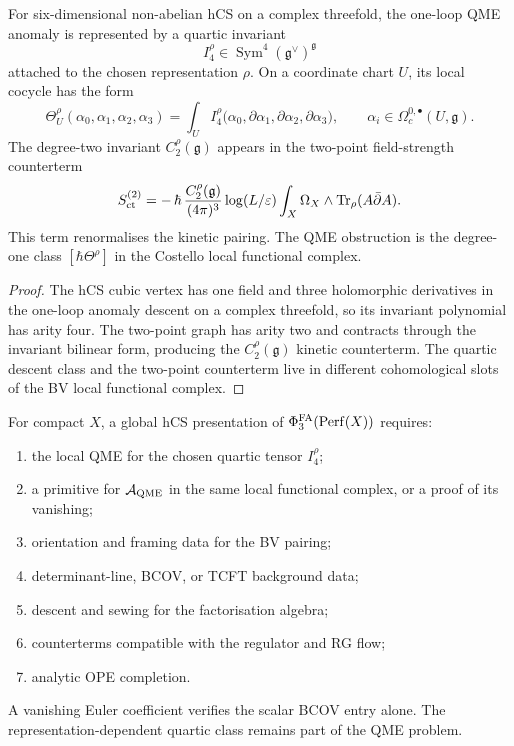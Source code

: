 \begin{proposition}
\label{prop:quartic-qme-quadratic-counterterm}
For six-dimensional non-abelian hCS on a complex threefold, the
one-loop QME anomaly is represented by a quartic invariant
\[
  I_4^\rho\in\operatorname{Sym}^4(\mathfrak g^\vee)^{\mathfrak g}
\]
attached to the chosen representation $\rho$. On a coordinate chart
$U$, its local cocycle has the form
\[
  \Theta^\rho_U(\alpha_0,\alpha_1,\alpha_2,\alpha_3)
  =
  \int_U
  I_4^\rho
  \bigl(\alpha_0,\partial\alpha_1,
  \partial\alpha_2,\partial\alpha_3\bigr),
  \qquad
  \alpha_i\in\Omega^{0,\bullet}_c(U,\mathfrak g).
\]
The degree-two invariant $C_2^\rho(\mathfrak g)$ appears in the
two-point field-strength counterterm
\[
  S_{\mathrm{ct}}^{(2)}
  =
  -\,\hbar\,\frac{C_2^\rho(\mathfrak g)}{(4\pi)^3}
  \log(L/\varepsilon)
  \int_X\Omega_X\wedge\operatorname{Tr}_\rho(A\bar\partial A).
\]
This term renormalises the kinetic pairing. The QME obstruction is the
degree-one class $[\hbar\Theta^\rho]$ in the Costello local functional
complex.
\end{proposition}

\begin{proof}
The hCS cubic vertex has one field and three holomorphic derivatives in
the one-loop anomaly descent on a complex threefold, so its invariant
polynomial has arity four. The two-point graph has arity two and
contracts through the invariant bilinear form, producing the
$C_2^\rho(\mathfrak g)$ kinetic counterterm. The quartic descent class
and the two-point counterterm live in different cohomological slots of
the BV local functional complex.
\end{proof}

\begin{proposition}
\label{prop:compact-proof-obligations}
For compact $X$, a global hCS presentation of
$\Phi^{\mathrm{FA}}_3(\mathrm{Perf}(X))$ requires:
\begin{enumerate}
\item the local QME for the chosen quartic tensor $I_4^\rho$;
\item a primitive for $\mathcal A_{\mathrm{QME}}$ in the same local functional
complex, or a proof of its vanishing;
\item orientation and framing data for the BV pairing;
\item determinant-line, BCOV, or TCFT background data;
\item descent and sewing for the factorisation algebra;
\item counterterms compatible with the regulator and RG flow;
\item analytic OPE completion.
\end{enumerate}
A vanishing Euler coefficient verifies the scalar BCOV entry alone. The
representation-dependent quartic class remains part of the QME problem.
\end{proposition}

